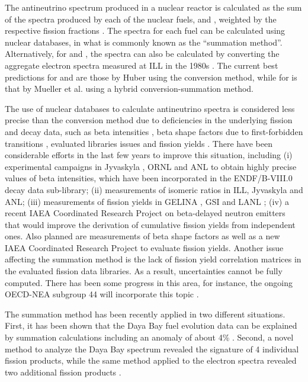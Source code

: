 \documentclass[letterpaper,draft]{ar-1col}
\begin{document}
The antineutrino spectrum produced in a nuclear reactor is calculated as the sum of the spectra produced by each of the nuclear fuels,  and , weighted by the respective fission fractions \cite{Vog81}.   The spectra for each fuel can be calculated using nuclear databases, in what is commonly known as the \enquote{summation method}.   Alternatively, for  and , the spectra can also be calculated by converting the aggregate electron spectra measured at ILL in the 1980s \cite{Fel82,Sch85,Hah89}.   The current best predictions for   and  are those by Huber \cite{Hub11} using the conversion method, while for  is that by Mueller et al. \cite{Mue11} using a hybrid conversion-summation method.

The use of nuclear databases to calculate antineutrino spectra is considered less precise than the conversion method due to deficiencies in the underlying fission and decay data, such as beta intensities \cite{20}, beta shape factors due to first-forbidden transitions \cite{Hay14}, evaluated libraries issues \cite{Son15} and fission yields \cite{Son16}.   There have been considerable efforts in the last few years to improve this situation, including (i) experimental campaigns in Jyvaskyla \cite{Alg10}, ORNL \cite{Ras16} and ANL \cite{MccTBD} to obtain highly precise values of beta intensities, which have been incorporated in the ENDF/B-VIII.0 decay data sub-library; (ii) measurements of isomeric ratios in ILL, Jyvaskyla and ANL; (iii) measurements of fission yields in GELINA \cite{Viv00}, GSI \cite{Pel17} and LANL \cite{Duk16}; (iv) a recent IAEA Coordinated Research Project on beta-delayed neutron emitters \cite{DimXX} that would improve the derivation of cumulative fission yields from independent ones.   Also planned are measurements of beta shape factors as well as a new IAEA Coordinated Research Project to evaluate fission yields.
Another issue affecting the summation method is the lack of fission yield correlation matrices in the evaluated fission data libraries.   As a result, uncertainties cannot be fully computed.  There has been some progress in this area, for instance, the ongoing OECD-NEA subgroup 44 will incorporate this topic \cite{SobXX}.

The summation method has been recently applied in two different situations.   First, it has been shown that the Daya Bay fuel evolution data \cite{An17} can be explained by summation calculations including an anomaly of about 4\% \cite{Hay18}.   Second, a novel method to analyze the Daya Bay spectrum revealed the signature of 4 individual fission products, while the same method applied to the electron spectra revealed two additional fission products \cite{Son18}.   
\end{document}
